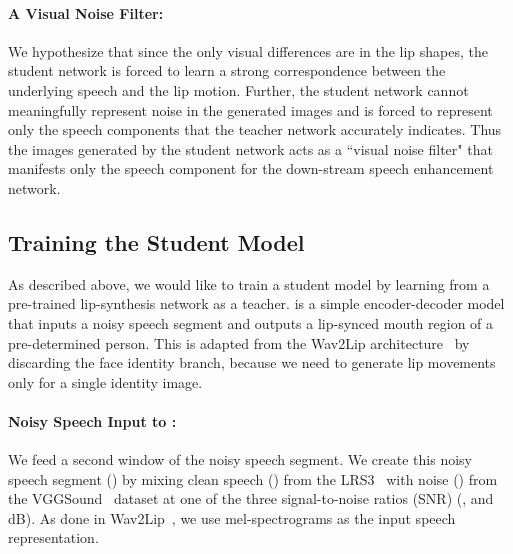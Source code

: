 \documentclass[10pt,twocolumn,letterpaper]{article}
\begin{document}
\vspace{-10pt}
\paragraph{A Visual Noise Filter:} We hypothesize that since the only visual differences are in the lip shapes, the student network is forced to learn a strong correspondence between the underlying speech and the lip motion. Further, the student network cannot meaningfully represent noise in the generated images and is forced to represent only the speech components that the teacher network accurately indicates. Thus the images generated by the student network acts as a ``visual noise filter" that manifests only the speech component for the down-stream speech enhancement network.

\subsection{Training the Student Model}
\label{subsection:step2}
As described above, we would like to train a student model  by learning from a pre-trained lip-synthesis network  as a teacher.  is a simple encoder-decoder model that inputs a noisy speech segment and outputs a lip-synced mouth region of a pre-determined person. This is adapted from the Wav2Lip architecture~\cite{wav2lip:2020} by discarding the face identity branch, because we need  to generate lip movements only for a single identity image.

\paragraph{Noisy Speech Input to :} We feed a  second window of the noisy speech segment. We create this noisy speech segment () by mixing clean speech () from the LRS3~\cite{Afouras18d} with noise () from the VGGSound~\cite{9053174} dataset at one of the three signal-to-noise ratios (SNR) (,  and  dB). As done in Wav2Lip~\cite{wav2lip:2020}, we use mel-spectrograms as the input speech representation. 
\end{document}
